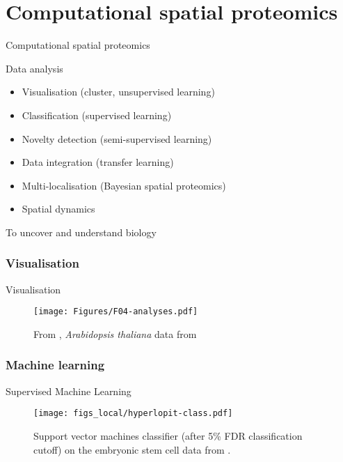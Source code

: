 \section{Computational spatial proteomics}


\begin{frame}{}
  \begin{center}
    \Large{Computational spatial proteomics}
  \end{center}
\end{frame}


\begin{frame}{Data analysis}
  \begin{itemize}
  \item Visualisation (cluster, unsupervised learning)
  \item Classification (supervised learning)
  \item Novelty detection (semi-supervised learning)
  \item Data integration (transfer learning)
  \item Multi-localisation (Bayesian spatial proteomics)
  \item Spatial dynamics
  \end{itemize}
  \centering
  {\Large To uncover and understand biology}
\end{frame}



\subsubsection*{Visualisation}
\label{sec:viz}

\begin{frame}{Visualisation}
  \begin{figure}
    \centering
    \texttt{[image: Figures/F04-analyses.pdf]}
    \caption{From \cite{Gatto:2010}, \textit{Arabidopsis thaliana} data
      from \cite{Dunkley:2006}}
  \end{figure}
\end{frame}

\subsubsection*{Machine learning}
\label{sec:ml}

\begin{frame}{Supervised Machine Learning}
  \begin{figure}[h]
    \centering
    \texttt{[image: figs\_local/hyperlopit-class.pdf]}
    \caption{Support vector machines classifier (after 5\% FDR
      classification cutoff) on the embryonic stem cell data from
      \cite{Christoforou:2016}.}
  \end{figure}
\end{frame}


